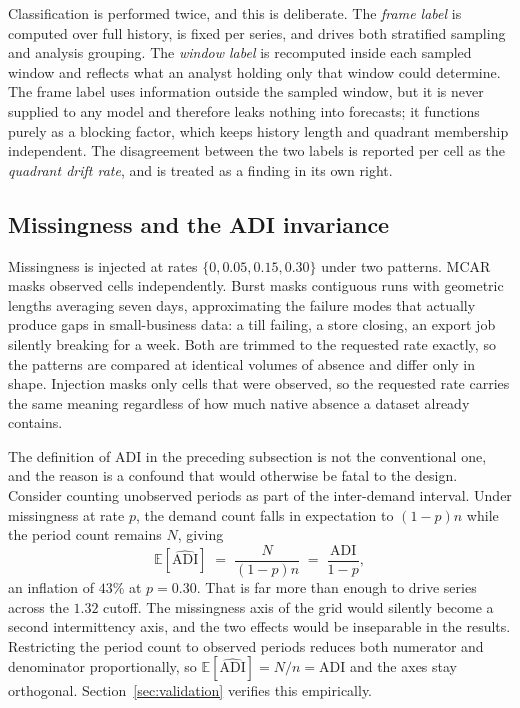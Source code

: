 \documentclass[11pt]{article}
\begin{document}
Classification is performed twice, and this is deliberate. The
\emph{frame label} is computed over full history, is fixed per series, and drives
both stratified sampling and analysis grouping. The \emph{window label} is
recomputed inside each sampled window and reflects what an analyst holding only
that window could determine. The frame label uses information outside the
sampled window, but it is never supplied to any model and therefore leaks nothing
into forecasts; it functions purely as a blocking factor, which keeps history
length and quadrant membership independent. The disagreement between the two
labels is reported per cell as the \emph{quadrant drift rate}, and is treated as
a finding in its own right.

\subsection{Missingness and the ADI invariance}
\label{sec:adi}

Missingness is injected at rates $\{0, 0.05, 0.15, 0.30\}$ under two patterns.
MCAR masks observed cells independently. Burst masks contiguous runs with
geometric lengths averaging seven days, approximating the failure modes that
actually produce gaps in small-business data: a till failing, a store closing, an
export job silently breaking for a week. Both are trimmed to the requested rate
exactly, so the patterns are compared at identical volumes of absence and differ
only in shape. Injection masks only cells that were observed, so the requested
rate carries the same meaning regardless of how much native absence a dataset
already contains.

The definition of ADI in the preceding subsection is not the conventional one,
and the reason is a confound that would otherwise be fatal to the design.
Consider counting unobserved periods as part of the inter-demand interval. Under
missingness at rate $p$, the demand count falls in expectation to $(1-p)n$ while
the period count remains $N$, giving
\[
\mathbb{E}[\widehat{\mathrm{ADI}}] \;=\; \frac{N}{(1-p)n} \;=\; \frac{\mathrm{ADI}}{1-p},
\]
an inflation of $43\%$ at $p = 0.30$. That is far more than enough to drive
series across the $1.32$ cutoff. The missingness axis of the grid would silently
become a second intermittency axis, and the two effects would be inseparable in
the results. Restricting the period count to observed periods reduces both
numerator and denominator proportionally, so
$\mathbb{E}[\widehat{\mathrm{ADI}}] = N/n = \mathrm{ADI}$ and the axes stay
orthogonal. Section~\ref{sec:validation} verifies this empirically.
\end{document}

